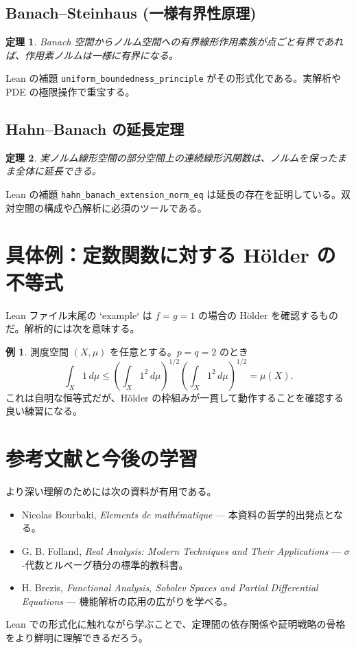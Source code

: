 \documentclass[a4paper]{ltjsarticle}
\theoremstyle{definition}
\newtheorem{example}{例}[section]
\theoremstyle{plain}
\newtheorem{theorem}{定理}[section]
\begin{document}
\subsection{Banach--Steinhaus (一様有界性原理)}
\begin{theorem}
Banach 空間からノルム空間への有界線形作用素族が点ごと有界であれば、作用素ノルムは一様に有界になる。
\end{theorem}
Lean の補題 \texttt{uniform\_boundedness\_principle} がその形式化である。実解析や PDE の極限操作で重宝する。

\subsection{Hahn--Banach の延長定理}
\begin{theorem}
実ノルム線形空間の部分空間上の連続線形汎関数は、ノルムを保ったまま全体に延長できる。
\end{theorem}
Lean の補題 \texttt{hahn\_banach\_extension\_norm\_eq} は延長の存在を証明している。双対空間の構成や凸解析に必須のツールである。

\section{具体例：定数関数に対する Hölder の不等式}
Lean ファイル末尾の `example` は $f=g=1$ の場合の Hölder を確認するものだ。解析的には次を意味する。

\begin{example}
測度空間 $(X,\mu)$ を任意とする。$p=q=2$ のとき
\[
\int_X 1 \, d\mu \le \left(\int_X 1^2 \, d\mu\right)^{1/2} \left(\int_X 1^2 \, d\mu\right)^{1/2} = \mu(X).
\]
これは自明な恒等式だが、Hölder の枠組みが一貫して動作することを確認する良い練習になる。
\end{example}

\section*{参考文献と今後の学習}
より深い理解のためには次の資料が有用である。

\begin{itemize}
  \item Nicolas Bourbaki, \emph{Elements de math\'ematique} --- 本資料の哲学的出発点となる。
  \item G. B. Folland, \emph{Real Analysis: Modern Techniques and Their Applications} --- $\sigma$-代数とルベーグ積分の標準的教科書。
  \item H. Brezis, \emph{Functional Analysis, Sobolev Spaces and Partial Differential Equations} --- 機能解析の応用の広がりを学べる。
\end{itemize}

Lean での形式化に触れながら学ぶことで、定理間の依存関係や証明戦略の骨格をより鮮明に理解できるだろう。
\end{document}
